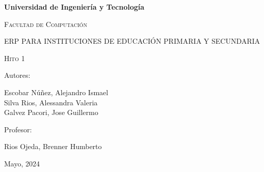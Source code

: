 \begin{titlepage}
	\centering
	\bfseries\LARGE{Universidad de Ingeniería y Tecnología} \par
	\vspace{1cm}
	\Large\scshape{Facultad de Computación} \par
	\vspace{2cm}
	\scshape\Huge{ERP PARA INSTITUCIONES DE EDUCACIÓN PRIMARIA Y SECUNDARIA} \par
	\vspace{2cm}
	\scshape\Large{Hito 1} \par
	\vfill
	\Large{Autores:} \par
	\Large Escobar Núñez, Alejandro Ismael \\
	Silva Rios, Alessandra Valeria \\
	Galvez Pacori, Jose Guillermo \par
	\vfill
	\Large Profesor: \par
	\Large Rios Ojeda, Brenner Humberto \par
	\vfill
	\Large{Mayo, 2024} \par
\end{titlepage}